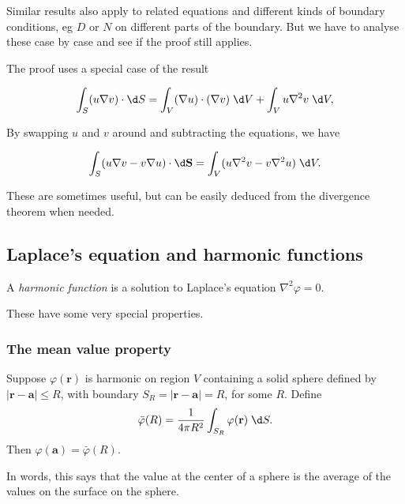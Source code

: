 \documentclass[a4paper]{article}
\begin{document}
Similar results also apply to related equations and different kinds of boundary conditions, eg $D$ or $N$ on different parts of the boundary. But we have to analyse these case by case and see if the proof still applies.

The proof uses a special case of the result
\begin{prop}
  \[
    \int_S (u\nabla v)\cdot \d S = \int_V (\nabla u)\cdot (\nabla v)\;\d V + \int_V u\nabla^2 v\;\d V,
  \]
\end{prop}
By swapping $u$ and $v$ around and subtracting the equations, we have
\begin{prop}
  \[
    \int_S (u\nabla v - v\nabla u)\cdot\d \mathbf{S} = \int_V (u\nabla^2 v - v\nabla^2 u)\;\d V.
  \]
\end{prop}
These are sometimes useful, but can be easily deduced from the divergence theorem when needed.
\subsection{Laplace's equation and harmonic functions}
\begin{defi}
  A \emph{harmonic function} is a solution to Laplace's equation $\nabla^2\varphi = 0$.
\end{defi}
These have some very special properties.
\subsubsection{The mean value property}
\begin{prop}
  Suppose $\varphi(\mathbf{r})$ is harmonic on region $V$ containing a solid sphere defined by $|\mathbf{r} - \mathbf{a}| \leq R$, with boundary $S_R = |\mathbf{r} - \mathbf{a}| = R$, for some $R$. Define
  \[
    \bar\varphi (R) = \frac{1}{4\pi R^2}\int_{S_R}\varphi(\mathbf{r})\;\d S.
  \]
  Then $\varphi(\mathbf{a}) = \bar\varphi (R)$.
\end{prop}
In words, this says that the value at the center of a sphere is the average of the values on the surface on the sphere.
\end{document}

